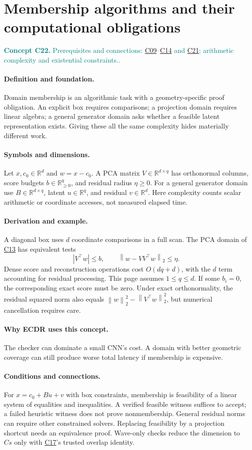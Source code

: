 \documentclass[11pt,a4paper]{article}
\newcommand{\R}{\mathbb R}
\newcommand{\norm}[1]{\left\lVert#1\right\rVert}
\newcommand{\abs}[1]{\left\lvert#1\right\rvert}
\newcommand{\conceptid}{Front matter}
\newcommand{\concept}[3]{\clearpage\renewcommand{\conceptid}{#1}%
\section{#2}\label{concept:#1}%
\textcolor{teal}{\textbf{Concept #1.} Prerequisites and connections: #3.}\par
\typeout{ECDR-CONCEPT-START #1 PAGE=\thepage}}
\begin{document}
\concept{C22}{Membership algorithms and their computational obligations}{\hyperref[concept:C09]{C09}--\hyperref[concept:C14]{C14} and \hyperref[concept:C21]{C21}; arithmetic complexity and existential constraints.}
\paragraph{Definition and foundation.}
Domain membership is an algorithmic task with a geometry-specific proof obligation. An explicit box requires comparisons; a projection domain requires linear algebra; a general generator domain asks whether a feasible latent representation exists. Giving these all the same complexity hides materially different work.
\paragraph{Symbols and dimensions.}
Let $x,c_0\in\R^d$ and $w=x-c_0$. A PCA matrix $V\in\R^{d\times q}$ has orthonormal columns, score budgets $b\in\R^q_{\ge0}$, and residual radius $\eta\ge0$. For a general generator domain use $B\in\R^{d\times q}$, latent $u\in\R^q$, and residual $v\in\R^d$. Here complexity counts scalar arithmetic or coordinate accesses, not measured elapsed time.
\paragraph{Derivation and example.}
A diagonal box uses $d$ coordinate comparisons in a full scan. The PCA domain of \hyperref[concept:C13]{C13} has equivalent tests
\[
 \abs{V^\top w}\le b,\qquad
 \norm{w-VV^\top w}_2\le\eta.
\]
Dense score and reconstruction operations cost $O(dq+d)$, with the $d$ term accounting for residual processing. This page assumes $1\le q\le d$. If some $b_i=0$, the corresponding exact score must be zero. Under exact orthonormality, the residual squared norm also equals $\norm{w}_2^2-\norm{V^\top w}_2^2$, but numerical cancellation requires care.
\paragraph{Why ECDR uses this concept.}
The checker can dominate a small CNN's cost. A domain with better geometric coverage can still produce worse total latency if membership is expensive.
\paragraph{Conditions and connections.}
For $x=c_0+Bu+v$ with box constraints, membership is feasibility of a linear system of equalities and inequalities. A verified feasible witness suffices to accept; a failed heuristic witness does not prove nonmembership. General residual norms can require other constrained solvers. Replacing feasibility by a projection shortcut needs an equivalence proof. Wave-only checks reduce the dimension to $Cs$ only with \hyperref[concept:C17]{C17}'s trusted overlap identity.
\par\label{endconcept:C22}
\end{document}
